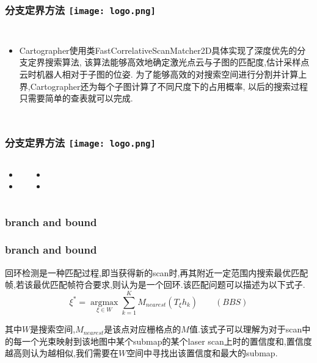 \begin{comment}
\end{comment}
\begin{frame}
\frametitle{分支定界方法 \hfill \texttt{[image: logo.png]}}
\begin{columns}
	\begin{itemize}
		\item Cartographer使用类FastCorrelativeScanMatcher2D具体实现了深度优先的分支定界搜索算法,
		该算法能够高效地确定激光点云与子图的匹配度,估计采样点云时机器人相对于子图的位姿.
		为了能够高效的对搜索空间进行分割并计算上界,Cartographer还为每个子图计算了不同尺度下的占用概率,
		以后的搜索过程只需要简单的查表就可以完成.

	\end{itemize}

\end{columns}
\end{frame}

\begin{comment}
\end{comment}
\begin{frame}
\frametitle{分支定界方法 \hfill \texttt{[image: logo.png]}}
\begin{columns}
	\begin{itemize}
		\item 
		\vspace{0.2cm}
		\item 
	\end{itemize}
	\begin{itemize}
		\item 
		\vspace{0.5cm}
		\item
	\end{itemize}
\end{columns}
\end{frame}


\begin{frame}[fragile]
\frametitle{branch and bound}
\end{frame}



\begin{frame}
\frametitle{branch and bound}
回环检测是一种匹配过程,即当获得新的scan时,再其附近一定范围内搜索最优匹配帧,若该最优匹配帧符合要求,则认为是一个回环.该匹配问题可以描述为以下式子.
\begin{equation}
\xi ^* = \mathop{argmax}\limits_{\xi \in W} \sum_{k=1}^K M_{nearest}(T_\xi h_k) \qquad (BBS)
\end{equation}

其中$W$是搜索空间,$M_{nearest}$是该点对应栅格点的$M$值.该式子可以理解为对于scan中的每一个光束映射到该地图中某个submap的某个laser scan上时的置信度和,置信度越高则认为越相似,我们需要在$W$空间中寻找出该置信度和最大的submap.

\end{frame}
